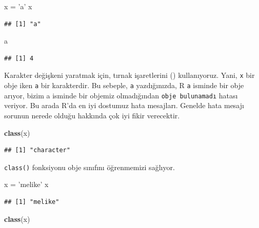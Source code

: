 \documentclass[]{book}
\newenvironment{Shaded}{\begin{snugshade}}{\end{snugshade}}
\newcommand{\KeywordTok}[1]{\textcolor[rgb]{0.13,0.29,0.53}{\textbf{#1}}}
\newcommand{\NormalTok}[1]{#1}
\newcommand{\StringTok}[1]{\textcolor[rgb]{0.31,0.60,0.02}{#1}}
\begin{document}
\begin{Shaded}
\begin{Highlighting}[]
\NormalTok{x =}\StringTok{ 'a'}
\NormalTok{x}
\end{Highlighting}
\end{Shaded}

\begin{verbatim}
## [1] "a"
\end{verbatim}

\begin{Shaded}
\begin{Highlighting}[]
\NormalTok{a}
\end{Highlighting}
\end{Shaded}

\begin{verbatim}
## [1] 4
\end{verbatim}

Karakter değişkeni yaratmak için, tırnak işaretlerini
(\texttt{\textquotesingle{}\textquotesingle{}}) kullanıyoruz. Yani,
\texttt{x} bir obje iken \texttt{\textquotesingle{}a\textquotesingle{}}
bir karakterdir. Bu sebeple, \texttt{a} yazdığınızda, R \texttt{a}
isminde bir obje arıyor, bizim a isminde bir objemiz olmadığından
\texttt{obje\ bulunamadı} hatası veriyor. Bu arada R'da en iyi dostumuz
hata mesajları. Genelde hata mesajı sorunun nerede olduğu hakkında çok
iyi fikir verecektir.

\begin{Shaded}
\begin{Highlighting}[]
\KeywordTok{class}\NormalTok{(x)}
\end{Highlighting}
\end{Shaded}

\begin{verbatim}
## [1] "character"
\end{verbatim}

\texttt{class()} fonksiyonu obje sınıfını öğrenmemizi sağlıyor.

\begin{Shaded}
\begin{Highlighting}[]
\NormalTok{x =}\StringTok{ 'melike'}
\NormalTok{x}
\end{Highlighting}
\end{Shaded}

\begin{verbatim}
## [1] "melike"
\end{verbatim}

\begin{Shaded}
\begin{Highlighting}[]
\KeywordTok{class}\NormalTok{(x)}
\end{Highlighting}
\end{Shaded}
\end{document}
